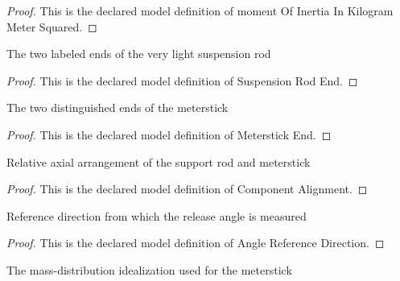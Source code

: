 \begin{proof}
  This is the declared model definition of moment Of Inertia In Kilogram Meter Squared.
\end{proof}
\begin{definition}
  \label{def:physics:phyx-mini-0227:phyxminiproblems-problemphyxmini0227-suspensionrodend}
  The two labeled ends of the very light suspension rod
\end{definition}
\begin{proof}
  This is the declared model definition of Suspension Rod End.
\end{proof}
\begin{definition}
  \label{def:physics:phyx-mini-0227:phyxminiproblems-problemphyxmini0227-meterstickend}
  The two distinguished ends of the meterstick
\end{definition}
\begin{proof}
  This is the declared model definition of Meterstick End.
\end{proof}
\begin{definition}
  \label{def:physics:phyx-mini-0227:phyxminiproblems-problemphyxmini0227-componentalignment}
  Relative axial arrangement of the support rod and meterstick
\end{definition}
\begin{proof}
  This is the declared model definition of Component Alignment.
\end{proof}
\begin{definition}
  \label{def:physics:phyx-mini-0227:phyxminiproblems-problemphyxmini0227-anglereferencedirection}
  Reference direction from which the release angle is measured
\end{definition}
\begin{proof}
  This is the declared model definition of Angle Reference Direction.
\end{proof}
\begin{definition}
  \label{def:physics:phyx-mini-0227:phyxminiproblems-problemphyxmini0227-stickmassdistribution}
  The mass-distribution idealization used for the meterstick
\end{definition}
